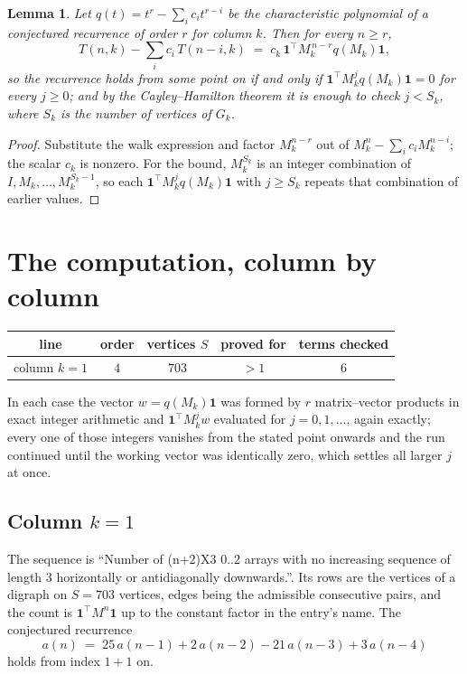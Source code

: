 \documentclass[11pt,a4paper]{article}
\theoremstyle{plain}
\newtheorem{lemma}[theorem]{Lemma}
\theoremstyle{definition}
\begin{document}
\begin{lemma}\label{lem:crit}
Let $q(t)=t^{r}-\sum_i c_it^{r-i}$ be the characteristic polynomial of a conjectured
recurrence of order $r$ for column $k$. Then for every $n\ge r$,
\[
T(n,k)-\sum_i c_i\,T(n-i,k)\;=\;c_k\,\mathbf{1}^{\!\top}M_k^{\,n-r}q(M_k)\mathbf{1},
\]
so the recurrence holds from some point on if and only if
$\mathbf{1}^{\!\top}M_k^{j}q(M_k)\mathbf{1}=0$ for every $j\ge0$; and by the
Cayley--Hamilton theorem it is enough to check $j<S_k$, where $S_k$ is the number of vertices
of $G_k$.
\end{lemma}

\begin{proof}
Substitute the walk expression and factor $M_k^{n-r}$ out of $M_k^{n}-\sum_ic_iM_k^{n-i}$;
the scalar $c_k$ is nonzero. For the bound, $M_k^{S_k}$ is an integer combination of
$I,M_k,\dots,M_k^{S_k-1}$, so each $\mathbf{1}^{\!\top}M_k^{j}q(M_k)\mathbf{1}$ with
$j\ge S_k$ repeats that combination of earlier values.
\end{proof}

\section{The computation, column by column}

\begin{center}
\begin{tabular}{ccccc}
line & order & vertices $S$ & proved for & terms checked \\ \hline
column $k$$=1$ & $4$ & $703$ & $>1$ & $6$ \\
\end{tabular}
\end{center}

In each case the vector $w=q(M_k)\mathbf{1}$ was formed by $r$ matrix--vector products in
exact integer arithmetic and $\mathbf{1}^{\!\top}M_k^{j}w$ evaluated for $j=0,1,\dots$,
again exactly; every one of those integers vanishes from the stated point onwards and the run
continued until the working vector was identically zero, which settles all larger $j$ at once.

\subsection*{Column $k$$=1$}
The sequence is ``Number of (n+2)X3 0..2 arrays with no increasing sequence of length 3 horizontally or antidiagonally downwards.''. Its rows are the vertices of a digraph on
$S=703$ vertices, edges being the admissible consecutive pairs, and the count is
$\mathbf{1}^{\!\top}M^{n}\mathbf{1}$ up to the constant factor in the entry's name.
The conjectured recurrence
\[
a(n)\;=\;25\,a(n-1) + 2\,a(n-2) - 21\,a(n-3) + 3\,a(n-4)
\]
holds from index $1+1$ on.
\end{document}

